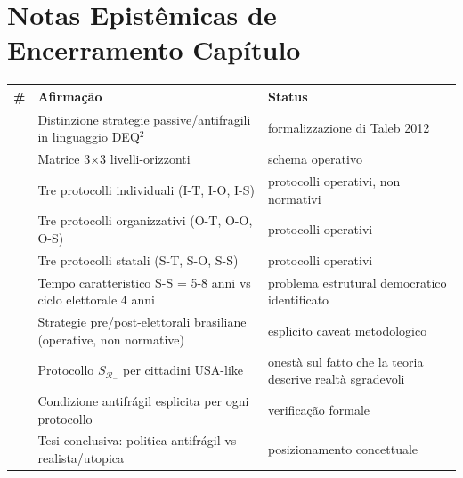 \section{Notas Epistêmicas de Encerramento
Capítulo}\label{note-epistemiche-di-chiusura-capítulo}

{\def\LTcaptype{none} %
{\small\begin{longtable}[]{@{}
  >{\raggedright\arraybackslash}p{}
  >{\raggedright\arraybackslash}p{}
  >{\raggedright\arraybackslash}p{}@{}}
\toprule\noalign{}
\begin{minipage}[b]{\linewidth}\raggedright
\#
\end{minipage} & \begin{minipage}[b]{\linewidth}\raggedright
Afirmação
\end{minipage} & \begin{minipage}[b]{\linewidth}\raggedright
Status
\end{minipage} \\
\midrule\noalign{}
\endhead
\bottomrule\noalign{}
\endlastfoot
1 & Distinzione strategie passive/antifragili in linguaggio DEQ$^2$ &
\Hypoth{} formalizzazione di Taleb 2012 \\
2 & Matrice 3$\times$3 livelli-orizzonti & \Hypoth{} schema operativo \\
3 & Tre protocolli individuali (I-T, I-O, I-S) & \Hypoth{} protocolli
operativi, non normativi \\
4 & Tre protocolli organizzativi (O-T, O-O, O-S) & \Hypoth{} protocolli
operativi \\
5 & Tre protocolli statali (S-T, S-O, S-S) & \Hypoth{} protocolli
operativi \\
6 & Tempo caratteristico S-S = 5-8 anni vs ciclo elettorale 4 anni &
\Hypoth{} problema estrutural democratico identificato \\
7 & Strategie pre/post-elettorali brasiliane (operative, non normative)
& \Hypoth{} esplicito caveat metodologico \\
8 & Protocollo \(S_{\mathcal{R}_-}\) per cittadini USA-like & \Hypoth{}
onestà sul fatto che la teoria descrive realtà sgradevoli \\
9 & Condizione antifrágil esplicita per ogni protocollo & \Hypoth{}
verificação formale \\
10 & Tesi conclusiva: politica antifrágil vs realista/utopica &
\Hypoth{} posizionamento concettuale \\
\end{longtable}}
}


